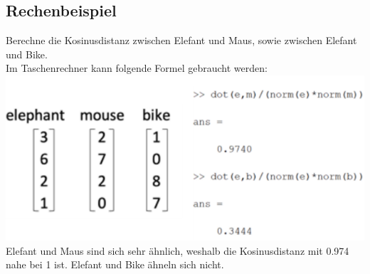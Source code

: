 \subsection{Rechenbeispiel}
Berechne die Kosinusdistanz zwischen Elefant und Maus, sowie zwischen Elefant und Bike.\\
Im Taschenrechner kann folgende Formel gebraucht werden:\\
\includegraphics[width=\linewidth]{img/elefant_maus.png}
Elefant und Maus sind sich sehr ähnlich, weshalb die Kosinusdistanz mit 0.974 nahe bei 1 ist. Elefant und Bike ähneln sich nicht.